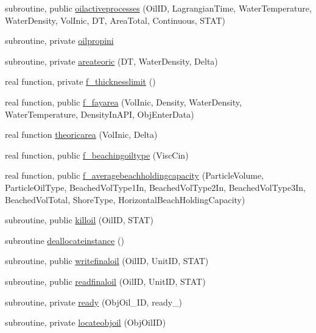 \begin{DoxyCompactItemize}
\item 
subroutine, public \mbox{\hyperlink{namespacemoduleoil__0d_a555da7465f065b530285f2a3661690f9}{oilactiveprocesses}} (Oil\+ID, Lagrangian\+Time, Water\+Temperature, Water\+Density, Vol\+Inic, DT, Area\+Total, Continuous, S\+T\+AT)
\item 
subroutine, private \mbox{\hyperlink{namespacemoduleoil__0d_a09a236d3f574c98899645e4bed0ef095}{oilpropini}}
\item 
subroutine, private \mbox{\hyperlink{namespacemoduleoil__0d_ae124c13fd1eb9319a89b0b5eb325d0be}{areateoric}} (DT, Water\+Density, Delta)
\item 
real function, private \mbox{\hyperlink{namespacemoduleoil__0d_afe23376b4667259aea9a6e2163036417}{f\+\_\+thicknesslimit}} ()
\item 
real function, public \mbox{\hyperlink{namespacemoduleoil__0d_a4e51cfec6aa7ab1925d6fe26889918be}{f\+\_\+fayarea}} (Vol\+Inic, Density, Water\+Density, Water\+Temperature, Density\+In\+A\+PI, Obj\+Enter\+Data)
\item 
real function \mbox{\hyperlink{namespacemoduleoil__0d_a45de73afad09d7f9580070bd1ef770e5}{theoricarea}} (Vol\+Inic, Delta)
\item 
real function, public \mbox{\hyperlink{namespacemoduleoil__0d_a9937a8fb676e29f80bcbbda743712412}{f\+\_\+beachingoiltype}} (Visc\+Cin)
\item 
real function, public \mbox{\hyperlink{namespacemoduleoil__0d_aee91b87fe4777a6a4e92f109ca97d6d5}{f\+\_\+averagebeachholdingcapacity}} (Particle\+Volume, Particle\+Oil\+Type, Beached\+Vol\+Type1\+In, Beached\+Vol\+Type2\+In, Beached\+Vol\+Type3\+In, Beached\+Vol\+Total, Shore\+Type, Horizontal\+Beach\+Holding\+Capacity)
\item 
subroutine, public \mbox{\hyperlink{namespacemoduleoil__0d_af1fa454b03e05f0047dd0b211f889b4b}{killoil}} (Oil\+ID, S\+T\+AT)
\item 
subroutine \mbox{\hyperlink{namespacemoduleoil__0d_af21b7b35e50b7197438d5bfc61cb5ac4}{deallocateinstance}} ()
\item 
subroutine, public \mbox{\hyperlink{namespacemoduleoil__0d_ac8ffff6a84b585607cbd75e554459582}{writefinaloil}} (Oil\+ID, Unit\+ID, S\+T\+AT)
\item 
subroutine, public \mbox{\hyperlink{namespacemoduleoil__0d_aa7833f46fb80b6ff52234957c56b77d2}{readfinaloil}} (Oil\+ID, Unit\+ID, S\+T\+AT)
\item 
subroutine, private \mbox{\hyperlink{namespacemoduleoil__0d_a5cfb3f6c158c2f89ed12f50f11b66786}{ready}} (Obj\+Oil\+\_\+\+ID, ready\+\_\+)
\item 
subroutine, private \mbox{\hyperlink{namespacemoduleoil__0d_a9c7229be13ce2cc83e0f461b6355f4fa}{locateobjoil}} (Obj\+Oil\+ID)
\end{DoxyCompactItemize}
